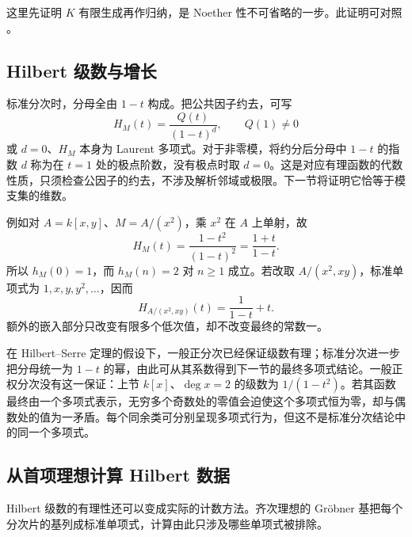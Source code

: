 这里先证明 \(K\) 有限生成再作归纳，是 Noether 性不可省略的一步。此证明可对照 \cite[\S13, Theorem 13.2, pp. 94--95]{Matsumura1989CommutativeRingTheory}。

\subsection{Hilbert 级数与增长}
\label{b3:subsec:1102:03}

标准分次时，分母全由 \(1-t\) 构成。把公共因子约去，可写
\[
	H_M(t)=\dfrac{Q(t)}{(1-t)^d},\qquad Q(1)\ne0
\]
或 \(d=0\)、\(H_M\) 本身为 Laurent 多项式。对于非零模，将约分后分母中 \(1-t\) 的指数 \(d\) 称为在 \(t=1\) 处的极点阶数，没有极点时取 \(d=0\)。这是对应有理函数的代数性质，只须检查公因子的约去，不涉及解析邻域或极限。下一节将证明它恰等于模支集的维数。

\ProseParagraphBreak
例如对 \(A=k[x,y]\)、\(M=A/(x^2)\)，乘 \(x^2\) 在 \(A\) 上单射，故
\[
	H_M(t)=\dfrac{1-t^2}{(1-t)^2}=\dfrac{1+t}{1-t}.
\]
所以 \(h_M(0)=1\)，而 \(h_M(n)=2\) 对 \(n\ge1\) 成立。若改取 \(A/(x^2,xy)\)，标准单项式为 \(1,x,y,y^2,\ldots\)，因而
\[
	H_{A/(x^2,xy)}(t)=\dfrac1{1-t}+t.
\]
额外的嵌入部分只改变有限多个低次值，却不改变最终的常数一。

\ProseParagraphBreak
在 Hilbert–Serre 定理的假设下，一般正分次已经保证级数有理；标准分次进一步把分母统一为 \(1-t\) 的幂，由此可从其系数得到下一节的最终多项式结论。一般正权分次没有这一保证：上节 \(k[x]\)、\(\deg x=2\) 的级数为 \(1/(1-t^2)\)。若其函数最终由一个多项式表示，无穷多个奇数处的零值会迫使这个多项式恒为零，却与偶数处的值为一矛盾。每个同余类可分别呈现多项式行为，但这不是标准分次结论中的同一个多项式。

\subsection{从首项理想计算 Hilbert 数据}
\label{b3:subsec:1102:04}

Hilbert 级数的有理性还可以变成实际的计数方法。齐次理想的 Gröbner 基把每个分次片的基列成标准单项式，计算由此只涉及哪些单项式被排除。

